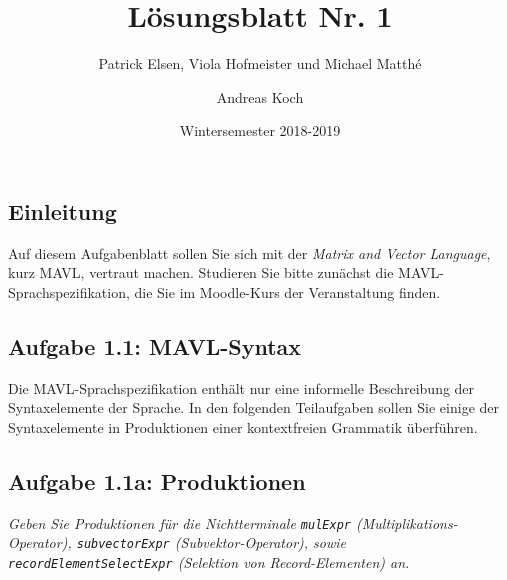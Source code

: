 \documentclass[
  ngerman,
  DIV=14
]{scrartcl}
\title{Lösungsblatt Nr. 1}
\date{Wintersemester 2018-2019}
\author{Andreas Koch}
\subtitle{Patrick Elsen, Viola Hofmeister und Michael Matthé}
\begin{document}
\maketitle

\subsection*{Einleitung}

Auf diesem Aufgabenblatt sollen Sie sich mit der \emph{Matrix and Vector Language}, kurz MAVL, vertraut machen. Studieren Sie bitte zunächst die MAVL-Sprachspezifikation, die Sie im Moodle-Kurs der Veranstaltung finden.

\subsection*{Aufgabe 1.1: MAVL-Syntax}

Die MAVL-Sprachspezifikation enthält nur eine informelle Beschreibung der Syntaxelemente der Sprache. In den folgenden Teilaufgaben sollen Sie einige der Syntaxelemente in Produktionen einer kontextfreien Grammatik überführen.

\subsection*{Aufgabe 1.1a: Produktionen}

\emph{Geben Sie Produktionen für die Nichtterminale \texttt{mulExpr} (Multiplikations-Operator), \texttt{subvectorExpr} (Subvektor-Operator), sowie \texttt{recordElementSelectExpr} (Selektion von Record-Elementen) an.}
\end{document}
